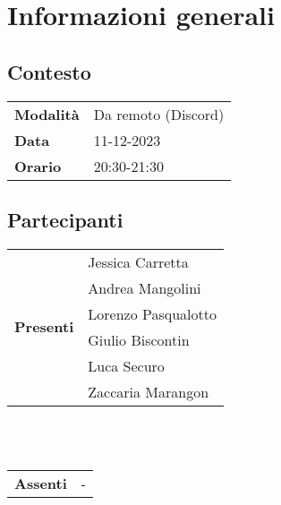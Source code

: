 \section{Informazioni generali} \label{sec:info_generali}
    \subsection{Contesto}
        \begin{tabular}{ p{2.2cm} | l }
            \textbf{Modalità} & Da remoto (Discord)\\  %
            \textbf{Data} & 11-12-2023\\    %
            \textbf{Orario} & 20:30-21:30   %
        \end{tabular}

        \subsection{Partecipanti}

        \begin{tabular}{ p{2.2cm} | l }   %
            \multirow{6}{*}{\textbf{Presenti}} 
                & Jessica Carretta \\
                & Andrea Mangolini \\
                & Lorenzo Pasqualotto \\
                & Giulio Biscontin \\
                & Luca Securo \\
                & Zaccaria Marangon
        \end{tabular} 
        \\
        \vspace*{0.2cm}
        \\
        \begin{tabular}{ p{2.2cm} | l }   %
            \multirow{1}{*}{\textbf{Assenti}} & - 
        \end{tabular}